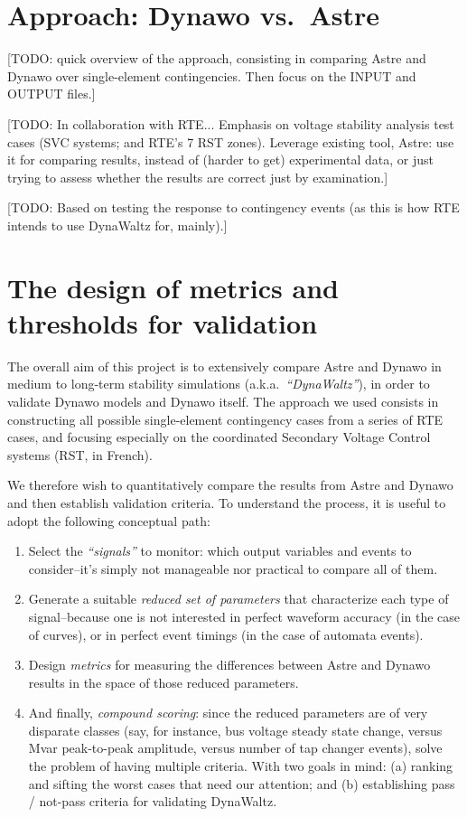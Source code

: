 \documentclass[11pt, a4paper, twoside, titlepage]{article}
\begin{document}
\section{Approach: Dynawo vs.\ Astre}
\label{sec:approach}
[TODO: quick overview of the approach, consisting in comparing Astre
  and Dynawo over single-element contingencies.  Then focus on the
  INPUT and OUTPUT files.]

[TODO: In collaboration with RTE... Emphasis on voltage stability
  analysis test cases (SVC systems; and RTE's 7 RST zones). Leverage
  existing tool, Astre: use it for comparing results, instead of
  (harder to get) experimental data, or just trying to assess whether
  the results are correct just by examination.]

[TODO: Based on testing the response to contingency events (as this is
  how RTE intends to use DynaWaltz for, mainly).]





\section{The design of metrics and thresholds for validation}
\label{sec:metrics}

The overall aim of this project is to extensively compare Astre and
Dynawo in medium to long-term stability simulations
(a.k.a.\ \emph{``DynaWaltz''}), in order to validate Dynawo models and
Dynawo itself. The approach we used consists in constructing all
possible single-element contingency cases from a series of RTE cases,
and focusing especially on the coordinated Secondary Voltage Control
systems (RST, in French).

We therefore wish to quantitatively compare the results from Astre and Dynawo
and then establish validation criteria. To understand the process, it is useful
to adopt the following conceptual path:
\begin{enumerate}
  \item Select the \emph{``signals''} to monitor: which output variables and
    events to consider--it's simply not manageable nor practical to compare all
    of them.
  \item Generate a suitable \emph{reduced set of parameters} that characterize
    each type of signal--because one is not interested in perfect waveform
    accuracy (in the case of curves), or in perfect event timings (in the case
    of automata events).
  \item Design \emph{metrics} for measuring the differences between Astre and
    Dynawo results in the space of those reduced parameters.
  \item And finally, \emph{compound scoring}: since the reduced parameters are
    of very disparate classes (say, for instance, bus voltage steady state
    change, versus Mvar peak-to-peak amplitude, versus number of tap changer
    events), solve the problem of having multiple criteria. With two goals in
    mind: (a) ranking and sifting the worst cases that need our attention; and
    (b) establishing pass / not-pass criteria for validating DynaWaltz.
\end{enumerate}
\end{document}
